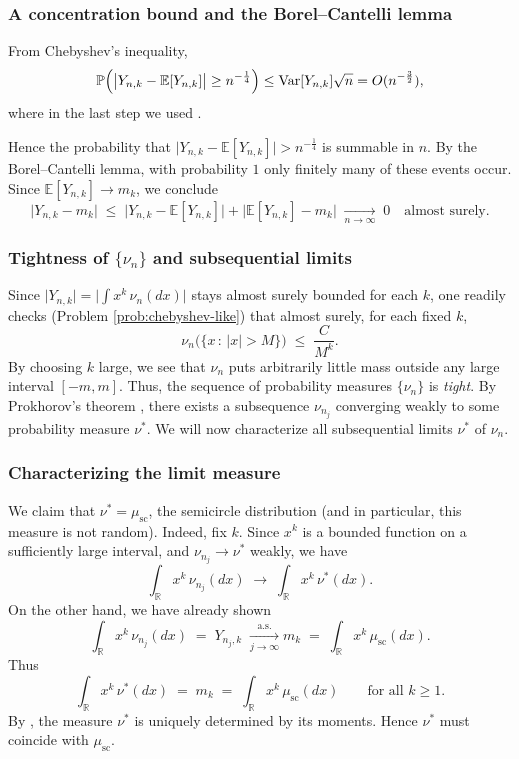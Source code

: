 \documentclass[letterpaper,11pt,oneside,reqno]{article}
\numberwithin{equation}{section}
\theoremstyle{definition}
\begin{document}
\subsubsection{A concentration bound and the Borel--Cantelli lemma}
From Chebyshev's inequality,
\[
  \mathbb{P}\Bigl(\bigl|Y_{n,k} - \mathbb{E}[Y_{n,k}]\bigr|
	\ge n^{-\frac{1}{4}}\Bigr)
  \le
  \operatorname{\mathrm{Var}}[Y_{n,k}]\sqrt{n}
	=O(n^{-\frac{3}{2}}),
\]
where in the last step we used .

Hence the probability that \(\lvert Y_{n,k} - \mathbb{E}[Y_{n,k}]\rvert > n^{-\frac{1}{4}}\) is summable in \(n\).  By the Borel--Cantelli lemma, with probability \(1\) only finitely many of these events occur.  Since \(\mathbb{E}[Y_{n,k}]\to m_k\), we conclude
\[
  \bigl|Y_{n,k} - m_k\bigr|
  \;\le\;\bigl|Y_{n,k}-\mathbb{E}[Y_{n,k}]\bigr|
  +\bigl|\mathbb{E}[Y_{n,k}]-m_k\bigr|
  \;\xrightarrow[n\to\infty]{}\;0
  \quad
  \text{almost surely.}
\]

\subsubsection{Tightness of \(\{\nu_n\}\) and subsequential limits}
\label{subsub:semicircle-tightness}

Since \(\lvert Y_{n,k}\rvert = \bigl|\int x^k\,\nu_n(dx)\bigr|\) stays
almost surely
bounded for each \(k\), one readily checks
(Problem \ref{prob:chebyshev-like})
that almost surely, for each fixed \(k\),
\begin{equation}
	\label{eq:chebyshev-like}
  \nu_n\bigl(\{x\,:\,|x|>M\}\bigr)
	\;\le\; \frac{C}{M^k}.
\end{equation}
By choosing \(k\) large, we see that \(\nu_n\) puts
arbitrarily little mass outside any large interval
\([-m,m]\).  Thus, the
sequence of probability measures
\(\{\nu_n\}\) is \emph{tight}.
By Prokhorov’s theorem \cite[Theorem~25.10]{billingsley1995probability},
there exists a subsequence \(\nu_{n_j}\) converging weakly to some probability measure \(\nu^*\).
We will now characterize all subsequential limits $\nu^*$ of $\nu_n$.

\subsubsection{Characterizing the limit measure}
\label{subsub:semicircle-characterization}

We claim that \(\nu^*=\mu_{\mathrm{sc}}\), the semicircle distribution
(and in particular, this measure is not random).
Indeed, fix \(k\).  Since \(x^k\) is a bounded function on a sufficiently large interval, and \(\nu_{n_j}\to\nu^*\) weakly, we have
\[
\int_{\mathbb{R}} x^k\,\nu_{n_j}(dx) \;\to\;\int_{\mathbb{R}} x^k\,\nu^*(dx).
\]
On the other hand, we have already shown
\[
\int_{\mathbb{R}} x^k \, \nu_{n_j}(dx)
   \;=\;
   Y_{n_j,k}
   \;\xrightarrow[j\to\infty]{\text{a.s.}}
   m_k
   \;=\;\int_{\mathbb{R}} x^k\,\mu_{\mathrm{sc}}(dx).
\]
Thus
\[
\int_{\mathbb{R}} x^k\,\nu^*(dx)
   \;=\;
   m_k
   \;=\;
   \int_{\mathbb{R}} x^k\,\mu_{\mathrm{sc}}(dx)
   \qquad
   \text{for all $k\ge1$.}
\]
By , the measure \(\nu^*\) is uniquely
determined by its moments.  Hence \(\nu^*\) must coincide
with \(\mu_{\mathrm{sc}}\).
\end{document}
